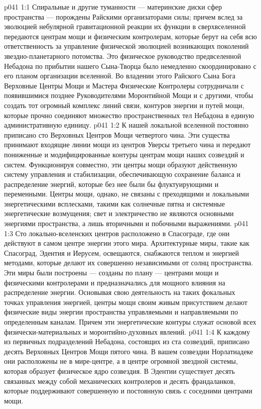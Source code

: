 \vs p041 1:1 Спиральные и другие туманности --- материнские диски сфер пространства --- порождены Райскими организаторами силы; причем вслед за эволюцией небулярной гравитационной реакции их функции в сверхвселенной передаются центрам мощи и физическим контролерам, которые берут на себя всю ответственность за управление физической эволюцией возникающих поколений звездно\hyp{}планетарного потомства. Это физическое руководство предвселенной Небадона по прибытии нашего Сына\hyp{}Творца было немедленно скоординировано с его планом организации вселенной. Во владении этого Райского Сына Бога Верховные Центры Мощи и Мастера Физические Контролеры сотрудничали с появившимися позднее Руководителями Моронтийной Мощи и с другими, чтобы создать тот огромный комплекс линий связи, контуров энергии и путей мощи, которые прочно соединяют множество пространственных тел Небадона в единую административную единицу.
\vs p041 1:2 К нашей локальной вселенной постоянно приписано сто Верховных Центров Мощи четвертого чина. Эти существа принимают входящие линии мощи из центров Уверсы третьего чина и передают пониженные и модифицированные контуры центрам мощи наших созвездий и систем. Функционируя совместно, эти центры мощи образуют действенную систему управления и стабилизации, обеспечивающую сохранение баланса и распределение энергий, которые без нее были бы флуктуирующими и переменными. Центры мощи, однако, не связаны с преходящими и локальными энергетическими всплесками, такими как солнечные пятна и системные энергетические возмущения; свет и электричество не являются основными энергиями пространства, а лишь вторичными и побочными выражениями.
\vs p041 1:3 Сто локально\hyp{}вселенских центров расположено в Спасограде, где они действуют в самом центре энергии этого мира. Архитектурные миры, такие как Спасоград, Эдентия и Иерусем, освещаются, снабжаются теплом и энергией методами, которые делают их совершенно независимыми от солнц пространства. Эти миры были построены --- созданы по плану --- центрами мощи и физическими контролерами и предназначались для мощного влияния на распределение энергии. Основывая свою деятельность на таких фокальных точках управления энергией, центры мощи своим живым присутствием делают физические виды энергии пространства управляемыми и направляемыми по определенным каналам. Причем эти энергетические контуры служат основой всех физически\hyp{}материальных и моронтийно\hyp{}духовных явлений.
\vs p041 1:4 К каждому из первичных подразделений Небадона, состоящих из ста созвездий, приписано десять Верховных Центров Мощи пятого чина. В вашем созвездии Норлатиадеке они расположены не в мире\hyp{}центре, а в центре огромной звездной системы, которая образует физическое ядро созвездия. В Эдентии существует десять связанных между собой механических контролеров и десять франдаланков, которые поддерживают совершенную и постоянную связь с соседними центрами мощи.
